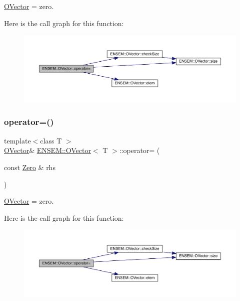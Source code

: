 \mbox{\hyperlink{classENSEM_1_1OVector}{O\+Vector}} = zero. 

Here is the call graph for this function\+:
\nopagebreak
\begin{figure}[H]
\begin{center}
\leavevmode
\includegraphics[width=350pt]{d0/d8d/classENSEM_1_1OVector_a54123bea722ddb2b3eaea0c948735b13_cgraph}
\end{center}
\end{figure}
\mbox{\label{classENSEM_1_1OVector_a54123bea722ddb2b3eaea0c948735b13}} 
\subsubsection{\texorpdfstring{operator=()}{operator=()}\hspace{0.1cm}{\footnotesize\ttfamily [2/12]}}
{\footnotesize\ttfamily template$<$class T $>$ \\
\mbox{\hyperlink{classENSEM_1_1OVector}{O\+Vector}}\& \mbox{\hyperlink{classENSEM_1_1OVector}{E\+N\+S\+E\+M\+::\+O\+Vector}}$<$ T $>$\+::operator= (\begin{DoxyParamCaption}\item[{const \mbox{\hyperlink{structENSEM_1_1Zero}{Zero}} \&}]{rhs }\end{DoxyParamCaption})\hspace{0.3cm}{\ttfamily [inline]}}



\mbox{\hyperlink{classENSEM_1_1OVector}{O\+Vector}} = zero. 

Here is the call graph for this function\+:
\nopagebreak
\begin{figure}[H]
\begin{center}
\leavevmode
\includegraphics[width=350pt]{d0/d8d/classENSEM_1_1OVector_a54123bea722ddb2b3eaea0c948735b13_cgraph}
\end{center}
\end{figure}
\mbox{\label{classENSEM_1_1OVector_a54123bea722ddb2b3eaea0c948735b13}} 
